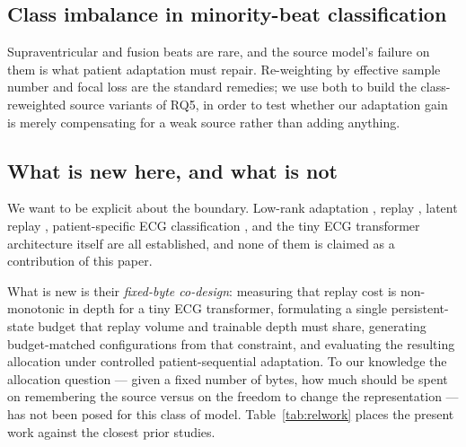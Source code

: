 \subsection{Class imbalance in minority-beat classification}

Supraventricular and fusion beats are rare, and the source model's failure on
them is what patient adaptation must repair. Re-weighting by effective sample
number \cite{cui2019classbalanced} and focal loss \cite{lin2017focal} are the
standard remedies; we use both to build the class-reweighted source
variants of RQ5, in order to test whether our adaptation gain is merely
compensating for a weak source rather than adding anything.

\subsection{What is new here, and what is not}

We want to be explicit about the boundary. Low-rank adaptation
\cite{hu2022lora}, replay \cite{rebuffi2017icarl}, latent replay
\cite{pellegrini2020latent}, patient-specific ECG classification
\cite{hu1997patient,kiranyaz2016realtime}, and the tiny ECG transformer
architecture itself \cite{busia2025tiny,vaswani2017attention} are all
established, and none of them is claimed as a contribution of this paper.

What is new is their \emph{fixed-byte co-design}: measuring that replay cost is
non-monotonic in depth for a tiny ECG transformer, formulating a single
persistent-state budget that replay volume and trainable depth must share,
generating budget-matched configurations from that constraint, and evaluating the
resulting allocation under controlled patient-sequential adaptation. To our
knowledge the allocation question --- given a fixed number of bytes, how much
should be spent on remembering the source versus on the freedom to change the
representation --- has not been posed for this class of model.
Table~\ref{tab:relwork} places the present work against the closest prior
studies.

